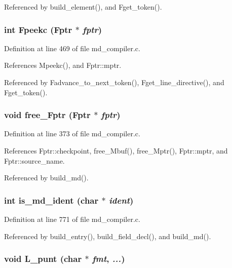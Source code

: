 Referenced by build\_\-element(), and Fget\_\-token().
\subsubsection{\setlength{\rightskip}{0pt plus 5cm}int Fpeekc (\bf{Fptr} $\ast$ {\em fptr})}\label{md__compiler_8c_c06c4367d84d0b622fea24b7c6702f47}




Definition at line 469 of file md\_\-compiler.c.

References Mpeekc(), and Fptr::mptr.

Referenced by Fadvance\_\-to\_\-next\_\-token(), Fget\_\-line\_\-directive(), and Fget\_\-token().
\subsubsection{\setlength{\rightskip}{0pt plus 5cm}void free\_\-Fptr (\bf{Fptr} $\ast$ {\em fptr})}\label{md__compiler_8c_0bb0eba7f807070cda672228ea3008d7}




Definition at line 373 of file md\_\-compiler.c.

References Fptr::checkpoint, free\_\-Mbuf(), free\_\-Mptr(), Fptr::mptr, and Fptr::source\_\-name.

Referenced by build\_\-md().
\subsubsection{\setlength{\rightskip}{0pt plus 5cm}int is\_\-md\_\-ident (char $\ast$ {\em ident})}\label{md__compiler_8c_39ca8b26d2e0c556d2146f76b6c1f51a}




Definition at line 771 of file md\_\-compiler.c.

Referenced by build\_\-entry(), build\_\-field\_\-decl(), and build\_\-md().
\subsubsection{\setlength{\rightskip}{0pt plus 5cm}void L\_\-punt (char $\ast$ {\em fmt},  {\em ...})}\label{md__compiler_8c_c8ccfa451c1bd1740a1b720ba5b4c3a9}




